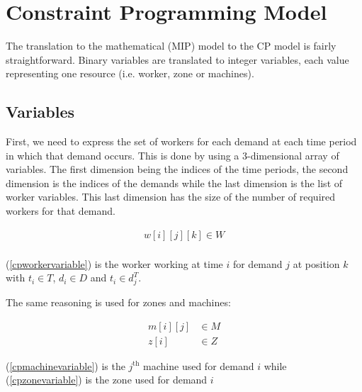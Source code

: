 \documentclass[../thesis.tex]{subfiles}
\begin{document}
\section{Constraint Programming Model}

The translation to the mathematical (MIP) model to the CP model is fairly
straightforward. Binary variables are translated to integer variables, each value representing
one resource (i.e. worker, zone or machines).



\subsection{Variables}

First, we need to express the set of workers for each demand at each time period in which that demand occurs.
This is done by using a 3-dimensional array of variables. The first dimension being the indices of the 
time periods, the second dimension is the indices of the demands while the last dimension is the list of worker variables. 
This last dimension has the size of the number of required workers for that demand.

\begin{equation}
\begin{split}
    w[i][j][k] \in W \label{cpworkervariable} \\
\end{split}
\end{equation}

(\ref{cpworkervariable}) is the worker working at time $i$ for demand $j$ at position $k$ with $t_i \in T$, $d_i \in D$ and $t_i \in d_j^T$.

The same reasoning is used for zones and machines:

\begin{align}
    m[i][j] &\in M \label{cpmachinevariable} \\ 
    z[i] &\in Z \label{cpzonevariable} 
\end{align}

(\ref{cpmachinevariable}) is the $j^{\text{th}}$ machine used for demand $i$ while (\ref{cpzonevariable}) is the zone used for demand $i$
\end{document}
